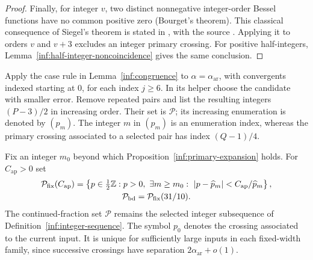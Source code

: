 \begin{proof}
Finally, for integer $v$, two distinct nonnegative integer-order
Bessel functions have no common positive zero (Bourget's theorem).
This classical consequence of Siegel's theorem is stated in
\cite[\S10.21(i)]{inf:dlmf}, with the source
\cite[\S15.28]{inf:watson}. Applying it to orders $v$ and $v+3$
excludes an integer primary crossing. For positive half-integers,
Lemma~\ref{inf:half-integer-noncoincidence} gives the same conclusion.
\end{proof}

\begin{definition}\label{inf:integer-sequence}
Apply the case rule in Lemma~\ref{inf:congruence} to
$\alpha=\alpha_{\mathrm{ar}}$, with convergents indexed starting at
$0$, for each index $j\ge6$. In its helper choose the candidate with
smaller error. Remove repeated pairs and list the resulting integers
$(P-3)/2$ in increasing order. Their set is $\mathcal P$; its increasing
enumeration is denoted by $(p_m)$.
The integer $m$ in $(p_m)$ is an enumeration index, whereas the primary
crossing associated to a selected pair has index $(Q-1)/4$.
\end{definition}

\begin{definition}\label{inf:input-families}
Fix an integer $m_0$ beyond which Proposition~\ref{inf:primary-expansion}
holds. For $C_{\mathrm{ap}}>0$ set
\begin{gather*}
 \mathcal P_{\mathrm{fix}}(C_{\mathrm{ap}})=
 \left\{p\in\tfrac12\Z:p>0,\ 
 \exists m\ge m_0:\ |p-\widehat p_m|<C_{\mathrm{ap}}/\widehat p_m\right\},\\
 \mathcal P_{\mathrm{bd}}=\mathcal P_{\mathrm{fix}}(31/10).
\end{gather*}
The continued-fraction set $\mathcal P$ remains the selected integer
subsequence of Definition~\ref{inf:integer-sequence}. The symbol
$p_0$ denotes the crossing associated to the current input. It is
unique for sufficiently large inputs in each fixed-width family,
since successive crossings have separation $2\alpha_{\mathrm{ar}}+o(1)$.
\end{definition}

